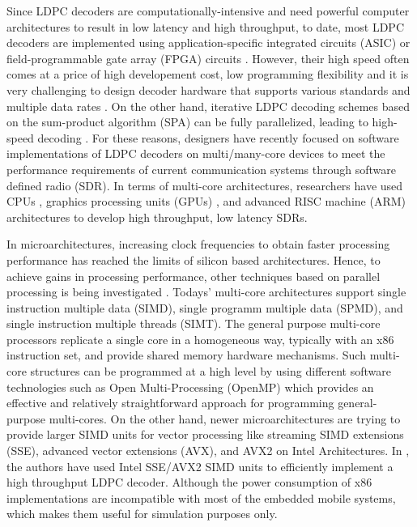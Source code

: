 \documentclass{article}
\begin{document}
Since LDPC decoders are computationally-intensive and need powerful computer architectures to result in low latency and high throughput, to date, most LDPC decoders are implemented using application-specific integrated circuits (ASIC) or field-programmable gate array (FPGA) circuits \cite{art_ldpc_OpenCl_1}. However, their high speed often comes at a price of high developement cost, low programming flexibility \cite{art_convolutional} and it is very challenging to design decoder hardware that supports various standards and multiple data rates \cite{art_cuda_openmp}. On the other hand, iterative LDPC decoding schemes based on the sum-product algorithm (SPA) can be fully parallelized, leading to high-speed decoding \cite{art_shannon}. For these reasons, designers have recently focused on software implementations of LDPC decoders on multi/many-core devices \cite{art_massively} to meet the performance requirements of current communication systems through software defined radio (SDR). In terms of multi-core architectures, researchers have used CPUs \cite{art_cpu_gpu, art_ldpc_cpu0}, graphics processing units (GPUs) \cite{art_memory_coalesced, art_massively, art_optimize_0}, and advanced RISC machine (ARM) \cite{art_ldpc_cpu0, art_neon} architectures to develop high throughput, low latency SDRs. 

In microarchitectures, increasing clock frequencies to obtain faster processing performance has reached the limits of silicon based architectures. Hence, to achieve gains in processing performance, other techniques based on parallel processing is being investigated \cite{art_ldpc_cpu1}. Todays' multi-core architectures support single instruction multiple data (SIMD), single programm multiple data (SPMD), and single instruction multiple threads (SIMT). The general purpose multi-core processors replicate a single core in a homogeneous way, typically with an x86 instruction set, and provide shared memory hardware mechanisms\cite{art_massively}. Such multi-core structures can be programmed at a high level by using different software technologies \cite{art_multicore_techs} such as Open Multi-Processing (OpenMP) \cite{art_openMp_book} which provides an effective and relatively straightforward approach for programming general-purpose multi-cores. On the other hand, newer microarchitectures are trying to provide larger SIMD units for vector processing like streaming SIMD extensions (SSE), advanced vector extensions (AVX), and AVX2 \cite{art_intel_sse} on Intel Architectures. In \cite{art_ldpc_cpu1}, the authors have used Intel SSE/AVX2 SIMD units to efficiently implement a high throughput LDPC decoder. Although the power consumption of x86 implementations are incompatible with most of the embedded mobile systems, which makes them useful for simulation purposes only.
\end{document}
